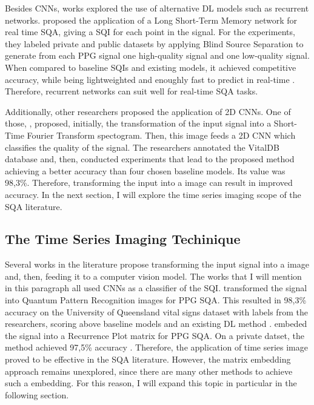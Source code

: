Besides \acrshort{CNN}s, works explored the use of alternative \acrshort{DL} models such as recurrent networks. \citeauthor{review-11} proposed the application of a Long Short-Term Memory network for real time \acrshort{SQA}, giving a \acrshort{SQI} for each point in the signal. For the experiments, they labeled private and public datasets by applying Blind Source Separation to generate from each \acrshort{PPG} signal one high-quality signal and one low-quality signal. When compared to baseline \acrshort{SQI}s and existing models, it achieved competitive accuracy, while being lightweighted and enoughly fast to predict in real-time \cite{review-11}. Therefore, recurrent networks can suit well for real-time \acrshort{SQA} tasks.

Additionally, other researchers proposed the application of 2D \acrshort{CNN}s. One of those, \citeauthor{review-12}, proposed, initially, the transformation of the input signal into a Short-Time Fourier Transform spectogram. Then, this image feeds a 2D \acrshort{CNN} which classifies the quality of the signal. The researchers annotated the VitalDB database and, then, conducted experiments that lead to the proposed method achieving a better accuracy than four chosen baseline models. Its value was 98,3\%. Therefore, transforming the input into a image can result in improved accuracy. In the next section, I will explore the time series imaging scope of the \acrshort{SQA} literature.


\subsection{The Time Series Imaging Techinique}
\label{sec:imaging}

Several works in the literature propose transforming the input signal into a image and, then, feeding it to a computer vision model. The works that I will mention in this paragraph all used \acrshort{CNN}s as a classifier of the \acrshort{SQI}. \citeauthor{review-13} transformed the signal into Quantum Pattern Recognition images for PPG \acrshort{SQA}. This resulted in 98,3\% accuracy on the University of Queensland vital signs dataset with labels from the researchers, scoring above baseline models and an existing \acrshort{DL} method \cite{review-13}. \citeauthor{review-15} embeded the signal into a Recurrence Plot matrix for PPG \acrshort{SQA}. On a private datset, the method achieved 97,5\% accuracy \cite{review-15}. Therefore, the application of time series image proved to be effective in the \acrshort{SQA} literature. However, the matrix embedding approach remains unexplored, since there are many other methods to achieve such a embedding. For this reason, I will expand this topic in particular in the following section.  

